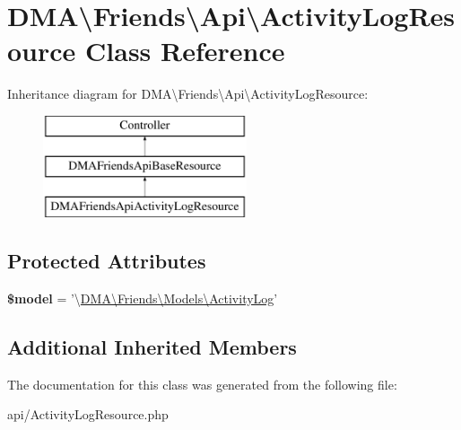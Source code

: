 \hypertarget{classDMA_1_1Friends_1_1Api_1_1ActivityLogResource}{\section{D\+M\+A\textbackslash{}Friends\textbackslash{}Api\textbackslash{}Activity\+Log\+Resource Class Reference}
\label{classDMA_1_1Friends_1_1Api_1_1ActivityLogResource}
}
Inheritance diagram for D\+M\+A\textbackslash{}Friends\textbackslash{}Api\textbackslash{}Activity\+Log\+Resource\+:\begin{figure}[H]
\begin{center}
\leavevmode
\includegraphics[height=3.000000cm]{d2/de6/classDMA_1_1Friends_1_1Api_1_1ActivityLogResource}
\end{center}
\end{figure}
\subsection*{Protected Attributes}
\begin{DoxyCompactItemize}
\item 
\hypertarget{classDMA_1_1Friends_1_1Api_1_1ActivityLogResource_abc7fd905609e3135075185ce7af02e43}{{\bfseries \$model} = '\textbackslash{}\hyperlink{classDMA_1_1Friends_1_1Models_1_1ActivityLog}{D\+M\+A\textbackslash{}\+Friends\textbackslash{}\+Models\textbackslash{}\+Activity\+Log}'}\label{classDMA_1_1Friends_1_1Api_1_1ActivityLogResource_abc7fd905609e3135075185ce7af02e43}

\end{DoxyCompactItemize}
\subsection*{Additional Inherited Members}


The documentation for this class was generated from the following file\+:\begin{DoxyCompactItemize}
\item 
api/Activity\+Log\+Resource.\+php\end{DoxyCompactItemize}
